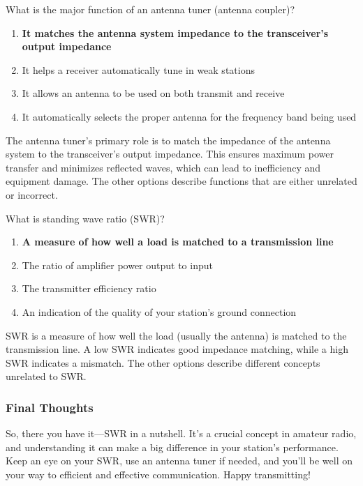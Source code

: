 \begin{tcolorbox}[colback=gray!10!white,colframe=black!75!black,title={T9B04}]
    What is the major function of an antenna tuner (antenna coupler)?
    \begin{enumerate}[label=\Alph*),noitemsep]
        \item \textbf{It matches the antenna system impedance to the transceiver's output impedance}
        \item It helps a receiver automatically tune in weak stations
        \item It allows an antenna to be used on both transmit and receive
        \item It automatically selects the proper antenna for the frequency band being used
    \end{enumerate}
\end{tcolorbox}

The antenna tuner's primary role is to match the impedance of the antenna system to the transceiver's output impedance. This ensures maximum power transfer and minimizes reflected waves, which can lead to inefficiency and equipment damage. The other options describe functions that are either unrelated or incorrect.

\begin{tcolorbox}[colback=gray!10!white,colframe=black!75!black,title={T9B12}]
    What is standing wave ratio (SWR)?
    \begin{enumerate}[label=\Alph*),noitemsep]
        \item \textbf{A measure of how well a load is matched to a transmission line}
        \item The ratio of amplifier power output to input
        \item The transmitter efficiency ratio
        \item An indication of the quality of your station’s ground connection
    \end{enumerate}
\end{tcolorbox}

SWR is a measure of how well the load (usually the antenna) is matched to the transmission line. A low SWR indicates good impedance matching, while a high SWR indicates a mismatch. The other options describe different concepts unrelated to SWR.

\subsubsection*{Final Thoughts}
So, there you have it—SWR in a nutshell. It’s a crucial concept in amateur radio, and understanding it can make a big difference in your station’s performance. Keep an eye on your SWR, use an antenna tuner if needed, and you’ll be well on your way to efficient and effective communication. Happy transmitting!
